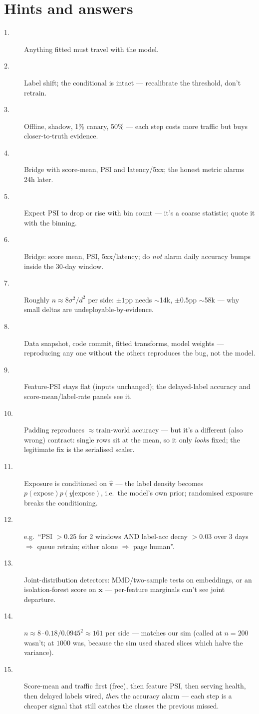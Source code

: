\section*{Hints and answers}
\begin{description}
\item[1.] Anything fitted must travel with the model.
\item[2.] Label shift; the conditional is intact --- recalibrate the
threshold, don't retrain.
\item[3.] Offline, shadow, 1\% canary, 50\% --- each step costs more
traffic but buys closer-to-truth evidence.
\item[4.] Bridge with score-mean, PSI and latency/5xx; the honest
metric alarms 24h later.
\item[5.] Expect PSI to drop or rise with bin count --- it's a
coarse statistic; quote it with the binning.
\item[6.] Bridge: score mean, PSI, 5xx/latency; do \emph{not} alarm
daily accuracy bumps inside the 30-day window.
\item[7.] Roughly $n \approx 8\sigma^2/d^2$ per side: $\pm1$pp needs
$\sim$14k, $\pm0.5$pp $\sim$58k --- why small deltas are
undeployable-by-evidence.
\item[8.] Data snapshot, code commit, fitted transforms, model
weights --- reproducing any one without the others reproduces the
bug, not the model.
\item[9.] Feature-PSI stays flat (inputs unchanged); the delayed-label
accuracy and score-mean/label-rate panels see it.
\item[10.] Padding reproduces $\approx$train-world accuracy --- but
it's a different (also wrong) contract: single rows sit at the mean,
so it only \emph{looks} fixed; the legitimate fix is the serialised
scaler.
\item[11.] Exposure is conditioned on $\hat\pi$ --- the label density
becomes $p(\text{expose})p(y|\text{expose})$, i.e.\ the model's own
prior; randomised exposure breaks the conditioning.
\item[12.] e.g.\ ``PSI $>0.25$ for 2 windows AND label-acc decay
$>0.03$ over 3 days $\Rightarrow$ queue retrain; either alone
$\Rightarrow$ page human''.
\item[13.] Joint-distribution detectors: MMD/two-sample tests on
embeddings, or an isolation-forest score on $\mathbf x$ ---
per-feature marginals can't see joint departure.
\item[14.] $n \approx 8\cdot0.18/0.0945^2 \approx 161$ per side ---
matches our sim (called at $n{=}200$ wasn't; at $1000$ was, because
the sim used shared slices which halve the variance).
\item[15.] Score-mean and traffic first (free), then feature PSI,
then serving health, then delayed labels wired, \emph{then} the
accuracy alarm --- each step is a cheaper signal that still catches
the classes the previous missed.
\end{description}

